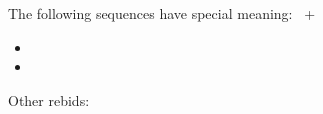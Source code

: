 The following sequences have special meaning: \force\ \inv+
\begin{itemize}
  \item \sequence{1\c\ --- 1\major/\nt\ --- 2\c\ --- 2\d*}
  \item \sequence{1\d\ --- 1\major/\nt --- 2\d --- 2\s/\h/\h*}
\end{itemize}

Other rebids: \nat\ \nf
